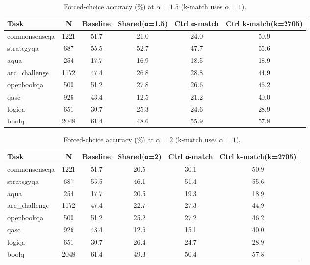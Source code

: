 \begin{table}[t]
\centering
\caption{Forced-choice accuracy (\%) at $\alpha=1.5$ (k-match uses $\alpha=1$).}
\label{tab:energy_kmatch_alpha_1_5}
\begin{tabular}{lccccc}
\hline
Task & N & Baseline & Shared(α=1.5) & Ctrl α-match & Ctrl k-match(k=2705) \\
\hline
commonsenseqa & 1221 & 51.7 & 21.0 & 24.0 & 50.9 \\
strategyqa & 687 & 55.5 & 52.7 & 47.7 & 55.6 \\
aqua & 254 & 17.7 & 16.9 & 18.5 & 18.9 \\
arc\_challenge & 1172 & 47.4 & 26.8 & 28.8 & 44.9 \\
openbookqa & 500 & 51.2 & 27.8 & 26.6 & 46.2 \\
qasc & 926 & 43.4 & 12.5 & 21.2 & 40.0 \\
logiqa & 651 & 30.7 & 25.3 & 24.6 & 28.9 \\
boolq & 2048 & 61.4 & 48.6 & 55.9 & 57.8 \\
\hline
\end{tabular}
\end{table}

\begin{table}[t]
\centering
\caption{Forced-choice accuracy (\%) at $\alpha=2$ (k-match uses $\alpha=1$).}
\label{tab:energy_kmatch_alpha_2}
\begin{tabular}{lccccc}
\hline
Task & N & Baseline & Shared(α=2) & Ctrl α-match & Ctrl k-match(k=2705) \\
\hline
commonsenseqa & 1221 & 51.7 & 20.5 & 30.1 & 50.9 \\
strategyqa & 687 & 55.5 & 46.1 & 51.4 & 55.6 \\
aqua & 254 & 17.7 & 20.5 & 19.3 & 18.9 \\
arc\_challenge & 1172 & 47.4 & 22.7 & 27.3 & 44.9 \\
openbookqa & 500 & 51.2 & 25.2 & 27.2 & 46.2 \\
qasc & 926 & 43.4 & 12.6 & 15.1 & 40.0 \\
logiqa & 651 & 30.7 & 26.4 & 24.7 & 28.9 \\
boolq & 2048 & 61.4 & 49.3 & 50.4 & 57.8 \\
\hline
\end{tabular}
\end{table}